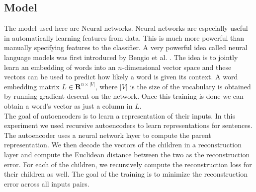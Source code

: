 \documentclass[conference]{IEEEtran}
\begin{document}
\subsection{Model}
The model used here are Neural networks. Neural networks are especially useful in automatically learning features from data. This is much more powerful than manually specifying features to the classifier. A very powerful idea called neural language models was first introduced by Bengio et al. \cite{bengio}. The idea is to jointly learn an embedding of words into an $n$-dimensional vector space and these vectors can be used to predict how likely a word is given its context. A word embedding matrix $L \in \mathbf{R}^{n \times |V|}$, where $|V|$ is the size of the vocabulary is obtained by running gradient descent on the network. Once this training is done we can obtain a word's vector as just a column in $L$.\\
The goal of autoencoders is to learn a representation of their inputs. In this experiment we used recursive autoencoders to learn representations for sentences. The autoencoder uses a neural network layer to compute the parent representation. We then decode the vectors of the children in a reconstruction layer and compute the Euclidean distance between the two as the reconstruction error. For each of the children, we recursively compute the reconstruction loss for their children as well. The goal of the training is to minimize the reconstruction error across all inputs pairs. 
\end{document}
